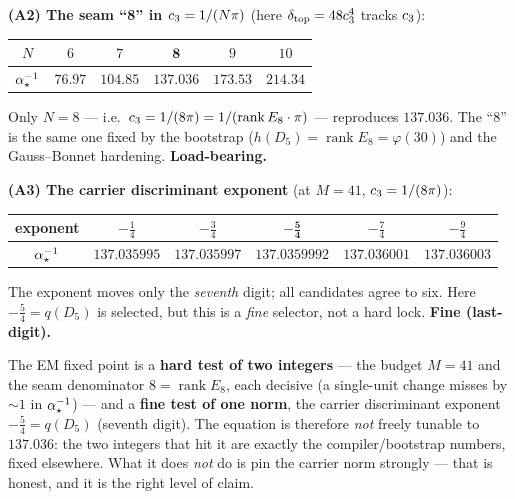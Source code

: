 \noindent\textbf{(A2) The seam ``8'' in $c_3=1/(N\pi)$} (here $\delta_{\mathrm{top}}=48c_3^4$ tracks $c_3$):
\begin{center}\footnotesize\renewcommand{\arraystretch}{1.15}
\begin{tabular}{@{}cccccc@{}}
\toprule
$N$ & $6$ & $7$ & $\mathbf{8}$ & $9$ & $10$ \\
\midrule
$\alpha^{-1}_\star$ & $76.97$ & $104.85$ & $\mathbf{137.036}$ & $173.53$ & $214.34$ \\
\bottomrule
\end{tabular}
\end{center}
Only $N=8$ --- i.e.\ $c_3=1/(8\pi)=1/(\operatorname{rank}E_8\cdot\pi)$ --- reproduces $137.036$. The
``8'' is the same one fixed by the bootstrap ($h(D_5)=\operatorname{rank}E_8=\varphi(30)$) and the
Gauss--Bonnet hardening. \textbf{Load-bearing.}

\noindent\textbf{(A3) The carrier discriminant exponent} (at $M=41$, $c_3=1/(8\pi)$):
\begin{center}\footnotesize\renewcommand{\arraystretch}{1.15}
\begin{tabular}{@{}cccccc@{}}
\toprule
exponent & $-\tfrac14$ & $-\tfrac34$ & $\mathbf{-\tfrac54}$ & $-\tfrac74$ & $-\tfrac94$ \\
\midrule
$\alpha^{-1}_\star$ & $137.035995$ & $137.035997$ & $\mathbf{137.0359992}$ & $137.036001$ & $137.036003$ \\
\bottomrule
\end{tabular}
\end{center}
The exponent moves only the \emph{seventh} digit; all candidates agree to six. Here $-\tfrac54=q(D_5)$ is
selected, but this is a \emph{fine} selector, not a hard lock. \textbf{Fine (last-digit).}

\begin{keybox}
The EM fixed point is a \textbf{hard test of two integers} --- the budget $M=41$ and the seam denominator
$8=\operatorname{rank}E_8$, each decisive (a single-unit change misses by $\sim1$ in $\alpha^{-1}_\star$) --- and a
\textbf{fine test of one norm}, the carrier discriminant exponent $-\tfrac54=q(D_5)$ (seventh digit). The
equation is therefore \emph{not} freely tunable to $137.036$: the two integers that hit it are exactly the
compiler/bootstrap numbers, fixed elsewhere. What it does \emph{not} do is pin the carrier norm strongly
--- that is honest, and it is the right level of claim. \mE
\end{keybox}

